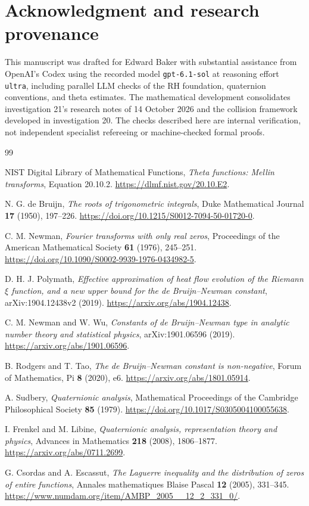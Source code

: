 \documentclass[11pt]{article}
\numberwithin{equation}{section}
\theoremstyle{definition}
\theoremstyle{remark}
\begin{document}
\clearpage
\section*{Acknowledgment and research provenance}
This manuscript was drafted for Edward Baker with substantial assistance
from OpenAI's Codex using the recorded model \texttt{gpt-6.1-sol} at
reasoning effort \texttt{ultra}, including parallel LLM checks of the RH
foundation, quaternion conventions, and theta estimates. The mathematical
development consolidates investigation 21's research notes of 14 October
2026 and the collision framework developed in investigation 20.
The checks described here are internal verification, not independent
specialist refereeing or machine-checked formal proofs. 
\begin{thebibliography}{99}
\raggedright
{}
NIST Digital Library of Mathematical Functions,
\emph{Theta functions: Mellin transforms}, Equation 20.10.2.
\url{https://dlmf.nist.gov/20.10.E2}.

N. G. de Bruijn,
\emph{The roots of trigonometric integrals},
Duke Mathematical Journal \textbf{17} (1950), 197--226.
\url{https://doi.org/10.1215/S0012-7094-50-01720-0}.

C. M. Newman,
\emph{Fourier transforms with only real zeros},
Proceedings of the American Mathematical Society \textbf{61} (1976),
245--251.
\url{https://doi.org/10.1090/S0002-9939-1976-0434982-5}.

D. H. J. Polymath,
\emph{Effective approximation of heat flow evolution of the Riemann
$\xi$ function, and a new upper bound for the de Bruijn--Newman constant},
arXiv:1904.12438v2 (2019).
\url{https://arxiv.org/abs/1904.12438}.

C. M. Newman and W. Wu,
\emph{Constants of de Bruijn--Newman type in analytic number theory
and statistical physics},
arXiv:1901.06596 (2019).
\url{https://arxiv.org/abs/1901.06596}.

B. Rodgers and T. Tao,
\emph{The de Bruijn--Newman constant is non-negative},
Forum of Mathematics, Pi \textbf{8} (2020), e6.
\url{https://arxiv.org/abs/1801.05914}.

A. Sudbery,
\emph{Quaternionic analysis},
Mathematical Proceedings of the Cambridge Philosophical Society
\textbf{85} (1979).
\url{https://doi.org/10.1017/S0305004100055638}.

I. Frenkel and M. Libine,
\emph{Quaternionic analysis, representation theory and physics},
Advances in Mathematics \textbf{218} (2008), 1806--1877.
\url{https://arxiv.org/abs/0711.2699}.

G. Csordas and A. Escassut,
\emph{The Laguerre inequality and the distribution of zeros of entire functions},
Annales mathematiques Blaise Pascal \textbf{12} (2005), 331--345.
\url{https://www.numdam.org/item/AMBP_2005__12_2_331_0/}.
\end{thebibliography}
\end{document}
